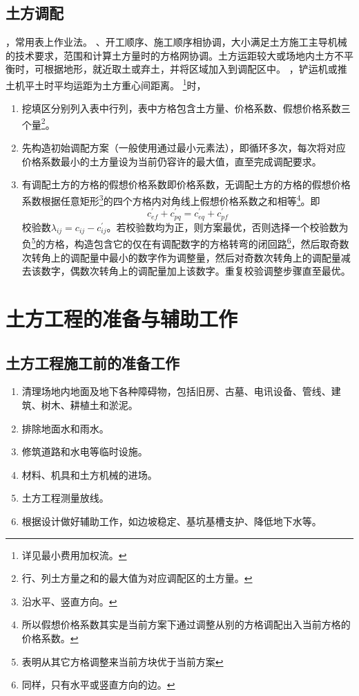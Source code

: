 \documentclass{book}
\begin{document}
\subsection{土方调配}
，常用表上作业法。
、开工顺序、施工顺序相协调，大小满足土方施工主导机械的技术要求，范围和计算土方量时的方格网协调。土方运距较大或场地内土方不平衡时，可根据地形，就近取土或弃土，并将区域加入到调配区中。
，铲运机或推土机平土时平均运距为土方重心间距离。
\footnote{详见最小费用加权流。}时，
\begin{enumerate}
    \item 挖填区分别列入表中行列，表中方格包含土方量、价格系数、假想价格系数三个量\footnote{行、列土方量之和的最大值为对应调配区的土方量。}。
    \item 先构造初始调配方案（一般使用通过最小元素法），即循环多次，每次将对应价格系数最小的土方量设为当前仍容许的最大值，直至完成调配要求。
    \item 有调配土方的方格的假想价格系数即价格系数，无调配土方的方格的假想价格系数根据任意矩形\footnote{沿水平、竖直方向。}的四个方格内对角线上假想价格系数之和相等\footnote{所以假想价格系数其实是当前方案下通过调整从别的方格调配出入当前方格的价格系数。}。即
          $$
              c_{ef}^{\prime} + c_{pq}^{\prime} = c_{eq}^{\prime} + c_{pf}^{\prime}
          $$
          校验数$\lambda_{ij} = c_{ij} - c_{ij}^{\prime}$。若校验数均为正，则方案最优，否则选择一个校验数为负\footnote{表明从其它方格调整来当前方块优于当前方案}的方格，构造包含它的仅在有调配数字的方格转弯的闭回路\footnote{同样，只有水平或竖直方向的边。}，然后取奇数次转角上的调配量中最小的数字作为调整量，然后对奇数次转角上的调配量减去该数字，偶数次转角上的调配量加上该数字。重复校验调整步骤直至最优。
\end{enumerate}
\section{土方工程的准备与辅助工作}
\subsection{土方工程施工前的准备工作}
\begin{enumerate}
    \item 清理场地内地面及地下各种障碍物，包括旧房、古墓、电讯设备、管线、建筑、树木、耕植土和淤泥。
    \item 排除地面水和雨水。
    \item 修筑道路和水电等临时设施。
    \item 材料、机具和土方机械的进场。
    \item 土方工程测量放线。
    \item 根据设计做好辅助工作，如边坡稳定、基坑基槽支护、降低地下水等。
\end{enumerate}
\end{document}
